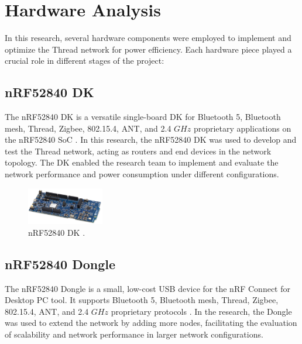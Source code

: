 \section{Hardware Analysis}

In this research, several hardware components were employed to implement and optimize the Thread network for power efficiency. Each hardware piece played a crucial role in different stages of the project:

\subsection{\texorpdfstring{\gls{nRF}}{nRF}52840 \texorpdfstring{\acrlong{DK}}{DK}}

The nRF52840 \gls{DK} is a versatile single-board \acrlong{DK} for Bluetooth 5, Bluetooth mesh, Thread, Zigbee, 802.15.4, \gls{ANT}, and 2.4 $GHz$ proprietary applications on the nRF52840 \gls{SoC} \cite{Semiconductor_Nordic_Product_Brief_2018_2.0}. In this research, the nRF52840 \gls{DK} was used to develop and test the Thread network, acting as routers and end devices in the network topology. The \acrlong{DK} enabled the research team to implement and evaluate the network performance and power consumption under different configurations.

\begin{figure}[H]
    \centering
    \includegraphics[width=0.3\textwidth]{images/situational_theoretical_analysis/nRF52840_DK.png}
    \caption{\gls{nRF}52840 \gls{DK} \cite{Semiconductor_Nordic_Product_Brief_2018_2.0}.}
    \label{fig:nRF52840_DK}
\end{figure}

\subsection{nRF52840 Dongle}

The \gls{nRF}52840 Dongle is a small, low-cost \gls{USB} device for the \gls{nRF} Connect for Desktop \gls{PC} tool. It supports Bluetooth 5, Bluetooth mesh, Thread, Zigbee, 802.15.4, \gls{ANT}, and 2.4 $GHz$ proprietary protocols \cite{Semiconductor_Nordic_Dongle_Brief_2018_2.0}. In the research, the Dongle was used to extend the network by adding more nodes, facilitating the evaluation of scalability and network performance in larger network configurations.

